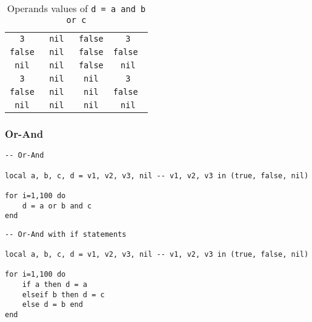 \begin{table}[H]
\begin{tabular}{|c|c|c|c|}
		\texttt{  3  } & \texttt{ nil } & \texttt{false} & \texttt{  3   } \\
		\texttt{false} & \texttt{ nil } & \texttt{false} & \texttt{false } \\
		\texttt{ nil } & \texttt{ nil } & \texttt{false} & \texttt{ nil  } \\
		\texttt{  3  } & \texttt{ nil } & \texttt{ nil } & \texttt{  3   } \\
		\texttt{false} & \texttt{ nil } & \texttt{ nil } & \texttt{false } \\
		\texttt{ nil } & \texttt{ nil } & \texttt{ nil } & \texttt{ nil  } \\
        \hline
    \end{tabular}
    \caption{Operands values of \texttt{d = a and b or c}}
    \label{tab:and-or-transformation}
\end{table}



\subsubsection{Or-And}

\begin{mdframed}[style=LuaStyleFrame]
\begin{lstlisting}[style=LuaStyle]
-- Or-And

local a, b, c, d = v1, v2, v3, nil -- v1, v2, v3 in (true, false, nil)

for i=1,100 do
 	d = a or b and c
end
\end{lstlisting}
\end{mdframed}

\begin{mdframed}[style=LuaStyleFrame]
\begin{lstlisting}[style=LuaStyle]
-- Or-And with if statements

local a, b, c, d = v1, v2, v3, nil -- v1, v2, v3 in (true, false, nil)

for i=1,100 do
    if a then d = a
    elseif b then d = c
    else d = b end
end
\end{lstlisting}
\end{mdframed}

